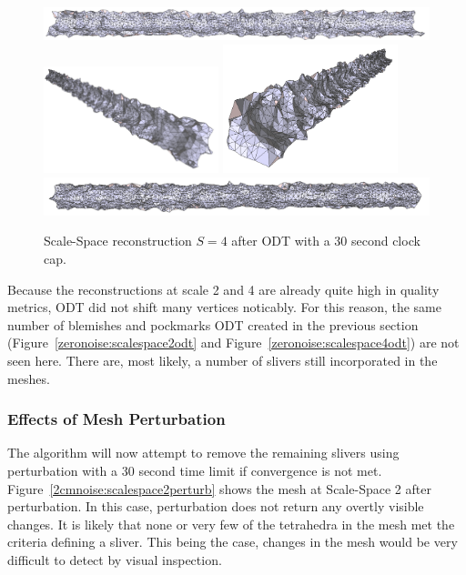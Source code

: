 \documentclass[12pt]{drexelthesis}
\let\Oldsubsubsection\subsubsection
\renewcommand{\subsubsection}{\FloatBarrier\Oldsubsubsection}
\begin{document}
\begin{figure}[!ht]
	\centering
		\includegraphics[width=5in]{simulated-lab-scan/2cmnoise/optimizedNeat/scalespace4odt00.png}
		\includegraphics[width=2in]{simulated-lab-scan/2cmnoise/optimizedNeat/scalespace4odt01.png}
		\includegraphics[width=2in]{simulated-lab-scan/2cmnoise/optimizedNeat/scalespace4odt02.png}
		\includegraphics[width=5in]{simulated-lab-scan/2cmnoise/optimizedNeat/scalespace4odt03.png}
		\caption[Scale-Space reconstruction $S = 4$ after ODT with a 30 second clock cap]{\centering Scale-Space reconstruction $S = 4$ after ODT with a 30 second clock cap.}
	\label{2cmnoise:scalespace4odt}
\end{figure}

Because the reconstructions at scale 2 and 4 are already quite high in quality metrics, ODT did not shift many vertices noticably. For this reason, the same number of blemishes and pockmarks ODT created in the previous section (Figure~\ref{zeronoise:scalespace2odt} and Figure~\ref{zeronoise:scalespace4odt}) are not seen here. There are, most likely, a number of slivers still incorporated in the meshes.

\subsubsection{Effects of Mesh Perturbation}

The algorithm will now attempt to remove the remaining slivers using perturbation with a 30 second time limit if convergence is not met. Figure~\ref{2cmnoise:scalespace2perturb} shows the mesh at Scale-Space 2 after perturbation. In this case, perturbation does not return any overtly visible changes. It is likely that none or very few of the tetrahedra in the mesh met the criteria defining a sliver. This being the case, changes in the mesh would be very difficult to detect by visual inspection.
\end{document}
